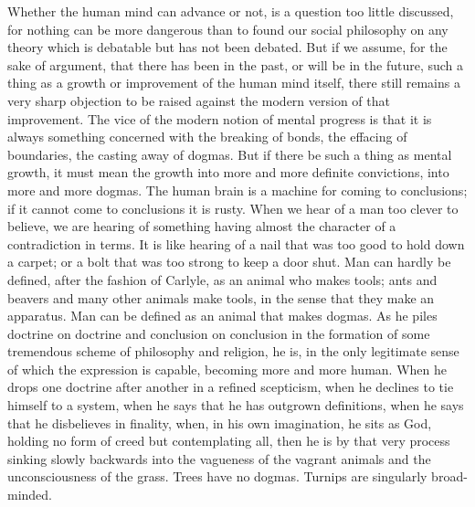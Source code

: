 Whether the human mind can advance or not, is a question too little discussed, for nothing can be more dangerous than to found our social philosophy on any theory which is debatable but has not been debated. But if we assume, for the sake of argument, that there has been in the past, or will be in the future, such a thing as a growth or improvement of the human mind itself, there still remains a very sharp objection to be raised against the modern version of that improvement. The vice of the modern notion of mental progress is that it is always something concerned with the breaking of bonds, the effacing of boundaries, the casting away of dogmas. But if there be such a thing as mental growth, it must mean the growth into more and more definite convictions, into more and more dogmas. The human brain is a machine for coming to conclusions; if it cannot come to conclusions it is rusty. When we hear of a man too clever to believe, we are hearing of something having almost the character of a contradiction in terms. It is like hearing of a nail that was too good to hold down a carpet; or a bolt that was too strong to keep a door shut. Man can hardly be defined, after the fashion of Carlyle, as an animal who makes tools; ants and beavers and many other animals make tools, in the sense that they make an apparatus. Man can be defined as an animal that makes dogmas. As he piles doctrine on doctrine and conclusion on conclusion in the formation of some tremendous scheme of philosophy and religion, he is, in the only legitimate sense of which the expression is capable, becoming more and more human. When he drops one doctrine after another in a refined scepticism, when he declines to tie himself to a system, when he says that he has outgrown definitions, when he says that he disbelieves in finality, when, in his own imagination, he sits as God, holding no form of creed but contemplating all, then he is by that very process sinking slowly backwards into the vagueness of the vagrant animals and the unconsciousness of the grass. Trees have no dogmas. Turnips are singularly broad-minded.

